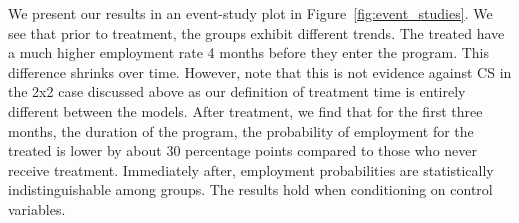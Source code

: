 \documentclass{scrartcl}
\begin{document}
We present our results in an event-study plot in Figure~\ref{fig:event_studies}. We see that prior to treatment, the groups exhibit different trends. The treated have a much higher employment rate 4 months before they enter the program. This difference shrinks over time. However, note that this is not evidence against CS in the 2x2 case discussed above as our definition of treatment time is entirely different between the models. After treatment, we find that for the first three months, the duration of the program, the probability of employment for the treated is lower by about 30 percentage points compared to those who never receive treatment. Immediately after, employment probabilities are statistically indistinguishable among groups. The results hold when conditioning on control variables.

\begin{figure}[h!]
  \centering
  

\end{figure}
\end{document}
